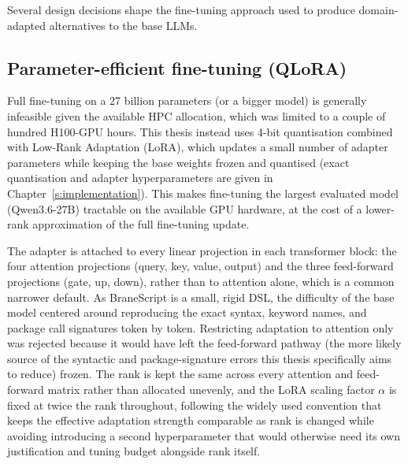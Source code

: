 Several design decisions shape the fine-tuning approach used to produce
domain-adapted alternatives to the base LLMs.

\subsection{Parameter-efficient fine-tuning (QLoRA)} 
Full fine-tuning on a 27 billion parameters (or a bigger model) is generally infeasible
given the available HPC allocation, which was limited to a couple of hundred H100-GPU hours.
This thesis instead uses 4-bit quantisation combined with Low-Rank Adaptation (LoRA), which
updates a small number of adapter parameters while keeping the base weights
frozen and quantised (exact quantisation and adapter hyperparameters are
given in Chapter~\ref{s:implementation}). This makes fine-tuning the largest
evaluated model (Qwen3.6-27B) tractable on the available GPU hardware, at the
cost of a lower-rank approximation of the full fine-tuning update.

The adapter is attached to every
linear projection in each transformer block: the four attention
projections (query, key, value, output) and the three feed-forward
projections (gate, up, down), rather than to attention alone, which is a
common narrower default. As BraneScript is a small, rigid DSL, the difficulty
of the base model centered around reproducing the exact syntax, keyword names, and package call 
signatures token by token.
Restricting adaptation to attention only was rejected because it would have left the
feed-forward pathway (the more likely source of the syntactic and
package-signature errors this thesis specifically aims to reduce) frozen. The
rank is kept the same across every attention and feed-forward matrix rather
than allocated unevenly, and the LoRA scaling factor $\alpha$ is fixed at
twice the rank throughout, following the widely used convention that keeps
the effective adaptation strength comparable as rank is changed while
avoiding introducing a second hyperparameter that would otherwise need its
own justification and tuning budget alongside rank itself.


